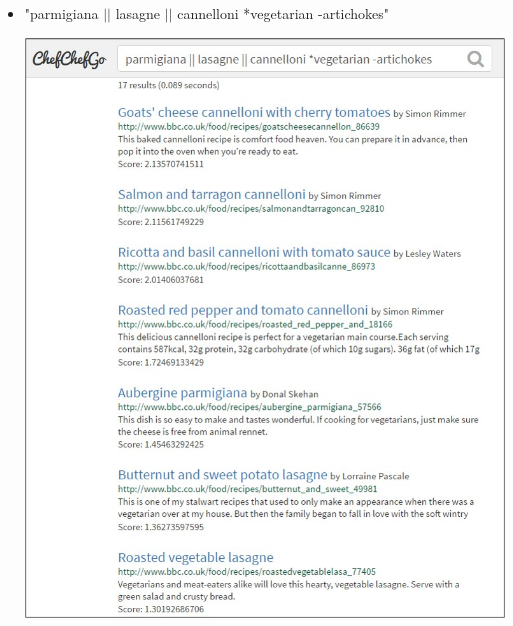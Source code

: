 \begin{itemize}
	\item "parmigiana $||$ lasagne $||$ cannelloni *vegetarian -artichokes"
	\begin{center}
		\includegraphics[scale = 0.5]{img/query5.jpg}
	\end{center}	
\end{itemize}

